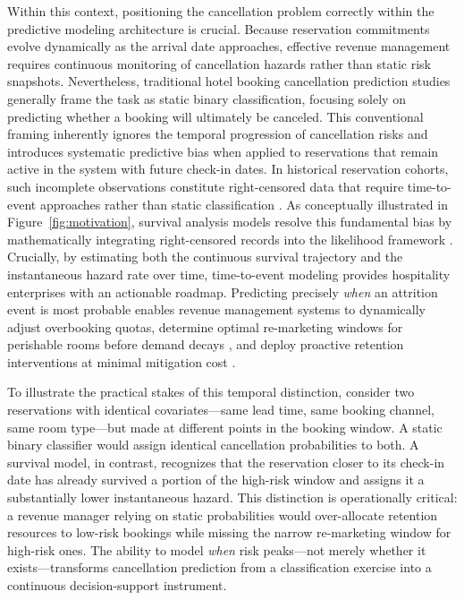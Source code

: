 \documentclass[pdflatex,iicol,sn-mathphys-ay]{sn-jnl}
\theoremstyle{thmstyleone}%
\theoremstyle{thmstyletwo}%
\theoremstyle{thmstylethree}%
\begin{document}
Within this context, positioning the cancellation problem correctly within the predictive modeling architecture is crucial. Because reservation commitments evolve dynamically as the arrival date approaches, effective revenue management requires continuous monitoring of cancellation hazards rather than static risk snapshots. Nevertheless, traditional hotel booking cancellation prediction studies generally frame the task as static binary classification, focusing solely on predicting whether a booking will ultimately be canceled. This conventional framing inherently ignores the temporal progression of cancellation risks and introduces systematic predictive bias when applied to reservations that remain active in the system with future check-in dates. In historical reservation cohorts, such incomplete observations constitute right-censored data that require time-to-event approaches rather than static classification \citep{kleinbaum2012survival, langbein2025interpretable}. As conceptually illustrated in Figure~\ref{fig:motivation}, survival analysis models resolve this fundamental bias by mathematically integrating right-censored records into the likelihood framework \citep{kovalev2020survlime, langbein2025interpretable}. Crucially, by estimating both the continuous survival trajectory and the instantaneous hazard rate over time, time-to-event modeling provides hospitality enterprises with an actionable roadmap. Predicting precisely \textit{when} an attrition event is most probable enables revenue management systems to dynamically adjust overbooking quotas, determine optimal re-marketing windows for perishable rooms before demand decays \citep{mir2026decoding}, and deploy proactive retention interventions at minimal mitigation cost \citep{antonio2017predicting, ampountolas2025predicting}.

To illustrate the practical stakes of this temporal distinction, consider two reservations with identical covariates—same lead time, same booking channel, same room type—but made at different points in the booking window. A static binary classifier would assign identical cancellation probabilities to both. A survival model, in contrast, recognizes that the reservation closer to its check-in date has already survived a portion of the high-risk window and assigns it a substantially lower instantaneous hazard. This distinction is operationally critical: a revenue manager relying on static probabilities would over-allocate retention resources to low-risk bookings while missing the narrow re-marketing window for high-risk ones. The ability to model \textit{when} risk peaks—not merely whether it exists—transforms cancellation prediction from a classification exercise into a continuous decision-support instrument.
\end{document}
